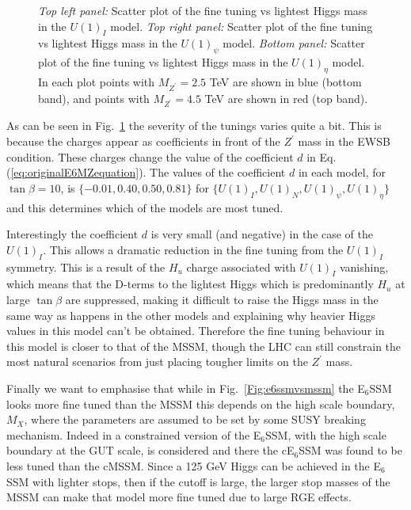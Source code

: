 \documentclass[preprint,amsmath,amssymb,aps,superscriptaddress,prd,showpacs,floatfix,nofootinbib]{revtex4-1}
\begin{document}
\begin{figure}
\begin{center}
\caption{\textit{Top left panel:} Scatter plot of the fine tuning vs lightest Higgs mass in the $U(1)_I$ model. \textit{Top right panel:} Scatter plot of the fine tuning vs lightest Higgs mass in the $U(1)_\psi$ model. \textit{Bottom panel:} Scatter plot of the fine tuning vs lightest Higgs mass in the $U(1)_\eta$ model. In each plot points with $M_{Z^\prime} = 2.5$ TeV are shown in blue
(bottom band), and points with $M_{Z^\prime} = 4.5$ TeV are shown in red (top band).}
\label{Fig:othere6modelsvsmssm}
\end{center}
\end{figure}

As can be seen in Fig.~\ref{Fig:othere6modelsvsmssm} the severity of the tunings varies quite
a bit.  This is because the charges appear as coefficients in front of
the $Z^\prime$ mass in the EWSB condition.  These charges change the
value of the coefficient $d$ in Eq. (\ref{eq:originalE6MZequation}).
The values of the coefficient $d$ in each model, for $\tan\beta = 10$,
is $\{-0.01, 0.40, 0.50, 0.81 \}$ for $\{U(1)_I, U(1)_N, U(1)_\psi,
U(1)_\eta \}$ and this determines which of the models are most tuned.

Interestingly the coefficient $d$ is very small (and negative) in the
case of the $U(1)_I$.  This allows a dramatic reduction in the fine
tuning from the $U(1)_I$ symmetry.  This is a result of the $H_u$
charge associated with $U(1)_I$ vanishing, which means that the
D-terms to the lightest Higgs which is predominantly $H_u$ at large
$\tan \beta$ are suppressed, making it difficult to raise the Higgs
mass in the same way as happens in the other models and explaining why
heavier Higgs values in this model can't be obtained.  Therefore the fine
tuning behaviour in this model is closer to that of the MSSM, though
the LHC can still constrain the most natural scenarios from just
placing tougher limits on the $Z^\prime$ mass.

Finally we want to emphasise that while in Fig.~\ref{Fig:e6ssmvsmssm}
the E$_6$SSM looks more fine tuned than the MSSM this depends on the
high scale boundary, $M_X$, where the parameters are assumed to be set
by some SUSY breaking mechanism.  Indeed in \cite{Athron:2013ipa} a
constrained version of the E$_6$SSM, with the high scale boundary at
the GUT scale, is considered and there the cE$_6$SSM was found to be
less tuned than the cMSSM. Since a 125 GeV Higgs can be achieved in
the E$_6$SSM with lighter stops, then if the cutoff is large, the
larger stop masses of the MSSM can make that model more fine tuned due
to large RGE effects.
\end{document}
